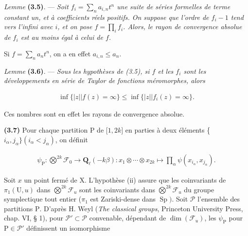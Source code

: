 \documentclass[10pt,leqno]{article}
\begin{document}
\noindent \emph{Lemme} \textbf{(3.5)}. — {\itshape Soit \(f_{i}=\sum _{n} a_{i,n}t^{n}\) une suite de séries formelles de terme constant un, et à coefficients réels positifs. On suppose que l’ordre de \(f_{i}- 1\) tend vers l’infini avec \(i\), et on pose \(f=\prod _{i} f_{i}\). Alors, le rayon de convergence absolue de \(f_{i}\) est au moins égal à celui de \(f\).}\par

\noindent Si \(f=\sum _{n} a_{n} t^{n}\), on a en effet \(a_{i,n}\leq a_{n}\).\par

\noindent \emph{Lemme} \textbf{(3.6)}. — {\itshape Sous les hypothèses de (3.5), si \(f\) et les \(f_{i}\) sont les développements en série de Taylor de fonctions méromorphes, alors}\par

\begin{equation*}\begin{gathered}\operatorname{inf}\{|z| | f(z)=\infty \} \leq  \operatorname{inf}\{|z| | f_{i}(z)=\infty \}.\end{gathered}\end{equation*}

\noindent Ces nombres sont en effet les rayons de convergence absolue.\par

\clearpage

\label{physical-14}\par\smallskip

\noindent \textbf{(3.7)} Pour chaque partition \(\mathrm{P}\) de [\(1,2k]\) en parties à deux éléments \{\(i_{\alpha },j_{\alpha }\} (i_{\alpha }<j_{\alpha })\), on définit\par

\begin{equation*}\begin{gathered}\psi _{\mathrm{P}} : \bigotimes\limits^{2k}\mathcal{F} _{0} \longrightarrow  \mathbf{Q}_{\ell }(- k\beta ) : x_{1}\otimes \cdots \otimes x_{2k} \longmapsto  \prod _{\alpha } \psi (x_{i_{\alpha }},x_{j_{\alpha }}).\end{gathered}\end{equation*}

\noindent Soit \(x\) un point fermé de \(\mathrm{X}\). L’hypothèse (ii) assure que les coinvariants de \(\pi _{1}(\mathrm{U},u)\) dans \(\bigotimes\limits^{2k}\mathcal{F} _{u}\) sont les coinvariants dans \(\bigotimes\limits^{2k}\mathcal{F} _{u}\) du groupe symplectique tout entier (\(\pi _{1}\) est Zariski-dense dans \(\operatorname{Sp})\). Soit \(\mathcal{P} \) l’ensemble des partitions \(\mathrm{P}\). D’après \(\mathrm{H}\). Weyl (\emph{The classical groups}, Princeton University Press, chap. VI, § 1), pour \(\mathcal{P} '\subset \mathcal{P} \) convenable, dépendant de \(\operatorname{dim}(\mathcal{F} _{u})\), les \(\psi _{\mathrm{P}}\) pour \(\mathrm{P}\in \mathcal{P} '\) définissent un isomorphisme\par
\end{document}
